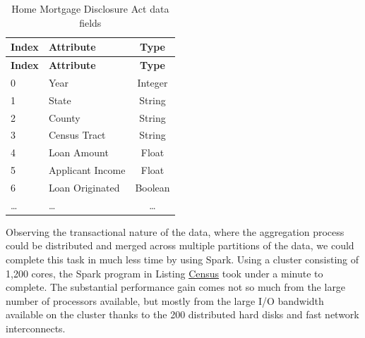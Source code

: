 \documentclass[]{krantz}
\begin{document}
\begin{longtable}[]{@{}llc@{}}
\caption{\label{tab:table5-2} Home Mortgage Disclosure Act data
fields}\tabularnewline
\toprule
\textbf{Index} & \textbf{Attribute} & \textbf{Type}\tabularnewline
\midrule
\endfirsthead
\toprule
\textbf{Index} & \textbf{Attribute} & \textbf{Type}\tabularnewline
\midrule
\endhead
0 & Year & Integer\tabularnewline
1 & State & String\tabularnewline
2 & County & String\tabularnewline
3 & Census Tract & String\tabularnewline
4 & Loan Amount & Float\tabularnewline
5 & Applicant Income & Float\tabularnewline
6 & Loan Originated & Boolean\tabularnewline
\ldots{} & \ldots{} & \ldots{}\tabularnewline
\bottomrule
\end{longtable}

Observing the transactional nature of the data, where the aggregation
process could be distributed and merged across multiple partitions of
the data, we could complete this task in much less time by using Spark.
Using a cluster consisting of 1,200 cores, the Spark program in Listing
\protect\hyperlink{list:parallel5}{Census} took under a minute to
complete. The substantial performance gain comes not so much from the
large number of processors available, but mostly from the large I/O
bandwidth available on the cluster thanks to the 200 distributed hard
disks and fast network interconnects.
\end{document}
